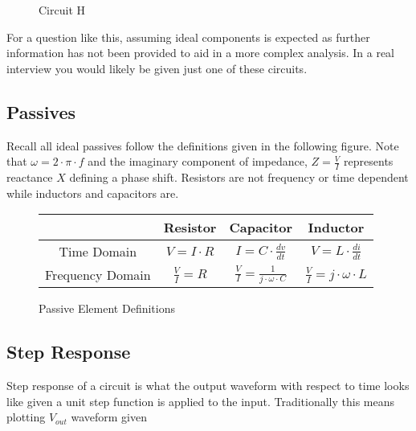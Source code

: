 \documentclass[main.tex]{subfiles}
\begin{document}
\begin{figure}[h!]
    \begin{center}
        \begin{circuitikz}[american]
            \label{fig:lseries_cseries}
        \end{circuitikz}
        \caption{Circuit H}
    \end{center}
\end{figure}

\spoilerline

\noindent For a question like this, assuming ideal components is expected as further information has not been provided to aid in a more complex analysis. In a real interview you would likely be given just one of these circuits.

\subsection{Passives}
Recall all ideal passives follow the definitions given in the following figure. Note that $\omega = 2 \cdot \pi \cdot f$ and the imaginary component of impedance, $Z = \frac{V}{I}$ represents reactance $X$ defining a phase shift. Resistors are not frequency or time dependent while inductors and capacitors are. 
\begin{figure}[h!]
    \centering
    \begin{tabular}{|c|c|c|c|}
        \hline
         & Resistor & Capacitor & Inductor \\ \hline
        Time Domain & $V = I \cdot R$ & $I = C \cdot \frac{dv}{dt}$ & $V = L \cdot \frac{di}{dt}$ \\ \hline
        Frequency Domain & $\frac{V}{I} = R$ & $\frac{V}{I} = \frac{1}{j \cdot \omega \cdot C}$ & $\frac{V}{I} = j \cdot \omega \cdot L$ \\ \hline
    \end{tabular}
    \caption{Passive Element Definitions}
    \label{fig:passive definitions}
\end{figure}

\subsection{Step Response}
Step response of a circuit is what the output waveform with respect to time looks like given a unit step function is applied to the input. Traditionally this means plotting $V_{out}$ waveform given 
\end{document}

